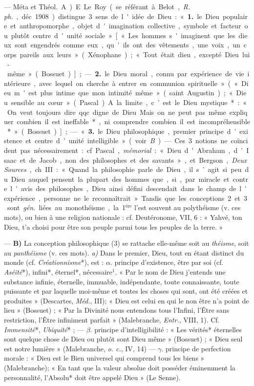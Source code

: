 \begin{itemize}[leftmargin=1cm, label=, itemsep=1pt]
 — Méta et \si{Théol.} A) E. Le Roy
(se référant à Belot, {\it R. ph.}, déc.1908)
distingue 3 sens de l'idée de Dieu :
« {\bf 1.} le Dieu populaire et anthropomorphe, objet d'imagination collective, symbole et facteur ou plutôt
centre d'unité sociale » [« Les hommes
s'imaginent que les dieux sont engendrés comme eux, qu'ils ont des
vêtements, une voix, un corps
pareils aux leurs » (Xénophane);
« Tout était dieu, excepté Dieu lui-même » (Bossuet)]; — {\bf 2.} le Dieu
moral, connu par expérience de vie
intérieure, avec lequel on cherche à
entrer en communion spirituelle »
(« Dieu m'est plus intime que mon
intimité même » (saint Augustin);
« Dieu sensible au cœur » (Pascal).
A la limite, c’est le Dieu mystique* :
« On veut toujours dire qqc. digne
de Dieu... Mais on ne peut pas même
expliquer combien il est ineffable*,
ni comprendre combien il est incompréhensible* » (Bossuet)]; —
« {\bf 3.} le Dieu philosophique, premier
principe d’existence et centre d’unité
intelligible » (voir {\it B}). — Ces 3 notions ne coïncident pas nécessairement : cf. Pascal, {\it mémorial} : « Dieu
d'Abraham, d’Isaac et de Jacob,
non des philosophes et des savants »,
et Bergson, {\it Deux Sources}, ch. III :
« Quand la philosophie parle de
Dieu,... il s’agit si peu du Dieu
auquel pensent la plupart des
hommes que, si, par miracle et
contre l'avis des philosophes, Dieu
ainsi défini descendait dans le champ
de l'expérience, personne ne le
reconnaîtrait. » Tandis que les conceptions 2 et 3 sont {\it gén.} liées au
monothéisme, la 1$^\text{ère}$ l’est souvent au
polythéisme (v. ces mots), ou bien à
une religion nationale : cf. Deutéronome, VII, 6 : « Yahvé, ton Dieu,
t'a choisi pour être son peuple parmi
tous les peuples de la terre. »

— {\bf B)} La conception philosophique (3) se rattache elle-même
soit au {\it théisme}, soit au {\it panthéisme}
(v. ces mots). {\it a)} Dans le premier,
Dieu, tout en étant distinct du
monde (cf. {\it Créationnisme}*), est :
$\alpha$. principe d'existence, être par soi
(cf. {\it Aséité}*), infini*, éternel*, nécessaire$^1$. « Par le nom de Dieu j’entends une substance infinie, éternelle, immuable, indépendante,
toute connaissante, toute puissante
et par laquelle moi-même et toutes
les choses qui sont, ont été créées et
produites » (Descartes, {\it Méd.}, III);
« Dieu est celui en qui le non être
n’a point de lieu » (Bossuet) ; « Par
la Divinité nous entendons tous
l'Infini, l’Être sans restriction, l'Être
infiniment parfait » (Malebranche,
{\it Entr.}, VIII, 1). Cf. {\it Immensité}*,
{\it Ubiquité}* ; — $\beta$. principe d'intelligibilité : « Les vérités* éternelles
sont quelque chose de Dieu ou
plutôt sont Dieu même » (Bossuet) ;
« Dieu seul est notre lumière » (Malebranche, {\it o. c.}, IV, 14) — $\gamma$. principe
de perfection morale : « Dieu est le
Bien universel qui comprend tous
les biens » (Malebranche); « En tant
que la valeur absolue doit posséder
éminemment la personnalité, l’Absolu*
doit être appelé Dieu » (Le
Senne).


\end{itemize}
